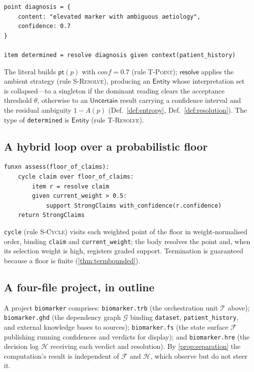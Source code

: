 \documentclass[11pt,a4paper]{article}
\theoremstyle{plain}
\theoremstyle{definition}
\theoremstyle{remark}
\newcommand{\rn}[1]{\textsc{#1}}                          %
\begin{document}
\begin{lstlisting}
point diagnosis = {
    content: "elevated marker with ambiguous aetiology",
    confidence: 0.7
}

item determined = resolve diagnosis given context(patient_history)
\end{lstlisting}

The literal builds $\mathsf{pt}(p)$ with $\mathit{conf}=0.7$ (rule
\rn{T-Point}); $\mathsf{resolve}$ applies the ambient strategy (rule
\rn{S-Resolve}), producing an $\mathsf{Entity}$ whose interpretation set is
collapsed---to a singleton if the dominant reading clears the acceptance
threshold $\theta$, otherwise to an $\mathsf{Uncertain}$ result carrying a
confidence interval and the residual ambiguity $1-A(p)$ (Def.~\ref{def:entropy},
Def.~\ref{def:resolution}). The type of \texttt{determined} is
$\mathsf{Entity}$ (rule \rn{T-Resolve}).

\subsection{A hybrid loop over a probabilistic floor}

\begin{lstlisting}
funxn assess(floor_of_claims):
    cycle claim over floor_of_claims:
        item r = resolve claim
        given current_weight > 0.5:
            support StrongClaims with_confidence(r.confidence)
    return StrongClaims
\end{lstlisting}

\texttt{cycle} (rule \rn{S-Cycle}) visits each weighted point of the floor in
weight-normalised order, binding \texttt{claim} and \texttt{current\_weight};
the body resolves the point and, when its selection weight is high, registers
graded support. Termination is guaranteed because a floor is finite
(\cref{thm:termbounded}).

\subsection{A four-file project, in outline}

A project \texttt{biomarker} comprises: \texttt{biomarker.trb} (the
orchestration unit $\mathcal{T}$ above); \texttt{biomarker.ghd} (the dependency
graph $\mathcal{G}$ binding \texttt{dataset}, \texttt{patient\_history}, and
external knowledge bases to sources); \texttt{biomarker.fs} (the state surface
$\mathcal{F}$ publishing running confidences and verdicts for display); and
\texttt{biomarker.hre} (the decision log $\mathcal{H}$ receiving each verdict and
resolution). By \cref{prop:separation} the computation's result is independent
of $\mathcal{F}$ and $\mathcal{H}$, which observe but do not steer it.
\end{document}
